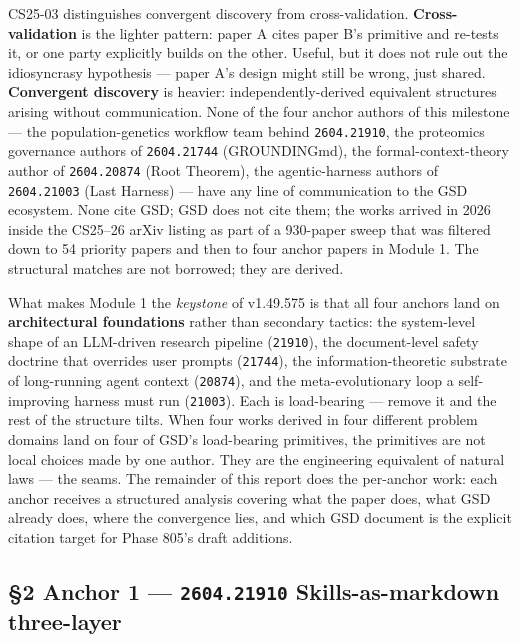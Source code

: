 \documentclass[11pt,letterpaper]{article}
\newcommand{\arxivid}[1]{\texttt{\textcolor{accent}{#1}}}
\begin{document}
CS25-03 distinguishes convergent discovery from cross-validation.
\textbf{Cross-validation} is the lighter pattern: paper A cites paper
B's primitive and re-tests it, or one party explicitly builds on the
other. Useful, but it does not rule out the idiosyncrasy hypothesis ---
paper A's design might still be wrong, just shared. \textbf{Convergent
discovery} is heavier: independently-derived equivalent structures
arising without communication. None of the four anchor authors of this
milestone --- the population-genetics workflow team behind
\arxivid{2604.21910}, the proteomics governance authors of
\arxivid{2604.21744} (GROUNDINGmd), the formal-context-theory author of
\arxivid{2604.20874} (Root Theorem), the agentic-harness authors of
\arxivid{2604.21003} (Last Harness) --- have any line of communication to
the GSD ecosystem. None cite GSD; GSD does not cite them; the works
arrived in 2026 inside the CS25--26 arXiv listing as part of a 930-paper
sweep that was filtered down to 54 priority papers and then to four
anchor papers in Module 1. The structural matches are not borrowed; they
are derived.

What makes Module 1 the \emph{keystone} of v1.49.575 is that all four
anchors land on \textbf{architectural foundations} rather than secondary
tactics: the system-level shape of an LLM-driven research pipeline
(\texttt{21910}), the document-level safety doctrine that overrides user
prompts (\texttt{21744}), the information-theoretic substrate of
long-running agent context (\texttt{20874}), and the meta-evolutionary
loop a self-improving harness must run (\texttt{21003}). Each is
load-bearing --- remove it and the rest of the structure tilts. When
four works derived in four different problem domains land on four of
GSD's load-bearing primitives, the primitives are not local choices made
by one author. They are the engineering equivalent of natural laws ---
the seams. The remainder of this report does the per-anchor work: each
anchor receives a structured analysis covering what the paper does, what
GSD already does, where the convergence lies, and which GSD document is
the explicit citation target for Phase 805's draft additions.

\subsection{\texorpdfstring{§2 Anchor 1 --- \arxivid{2604.21910}
Skills-as-markdown
three-layer}{§2 Anchor 1 --- \arxivid{2604.21910} Skills-as-markdown three-layer}}
\end{document}
